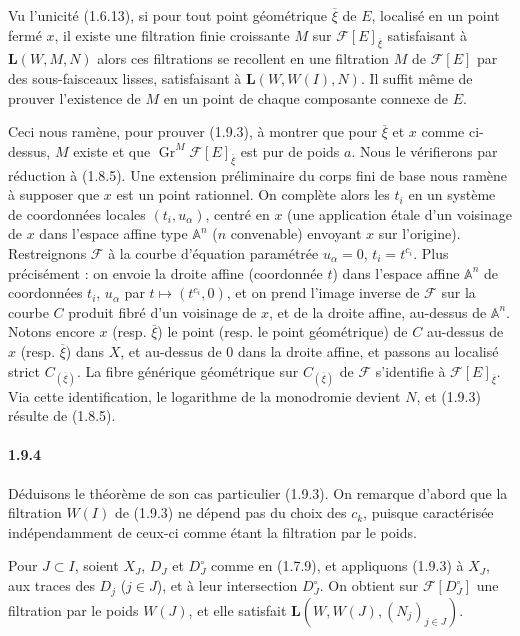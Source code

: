 \documentclass[12pt,a4paper]{article}
\theoremstyle{plain}
\theoremstyle{definition}
\theoremstyle{remark}
\DeclareMathOperator{\Gr}{Gr}
\renewcommand{\AA}{\ensuremath{\mathbb{A}}}
\begin{document}
Vu l'unicit\'e (1.6.13), si pour tout point g\'eom\'etrique $\overline{\xi}$ de $E$, localis\'e en un point ferm\'e $x$, il existe une filtration finie croissante $M$ sur $\mathscr{F}[E]_{\overline{\xi}}$ satisfaisant \`a $\mathbf{L}(W, M, N)$ alors ces filtrations se recollent en une filtration $M$ de $\mathscr{F}[E]$ par des sous-faisceaux lisses, satisfaisant \`a $\mathbf{L}(W, W(I), N)$. Il suffit m\^eme de prouver l'existence de $M$ en un point de chaque composante connexe de $E$.

Ceci nous ram\`ene, pour prouver (1.9.3), \`a montrer que pour $\overline{\xi}$ et $x$ comme ci-dessus, $M$ existe et que $\Gr^M \mathscr{F}[E]_{\overline{\xi}}$ est pur de poids $a$. Nous le v\'erifierons par r\'eduction \`a (1.8.5). Une extension pr\'eliminaire du corps fini de base nous ram\`ene \`a supposer que $x$ est un point rationnel. On compl\`ete alors les $t_i$ en un syst\`eme de coordonn\'ees locales $(t_i, u_\alpha)$, centr\'e en $x$ (une application \'etale d'un voisinage de $x$ dans l'espace affine type $\AA^n$ ($n$ convenable) envoyant $x$ sur l'origine). Restreignons $\mathscr{F}$ \`a la courbe d'\'equation param\'etr\'ee $u_\alpha = 0$, $t_i = t^{c_i}$. Plus pr\'ecis\'ement : on envoie la droite affine (coordonn\'ee $t$) dans l'espace affine $\AA^n$ de coordonn\'ees $t_i$, $u_\alpha$ par $t \mapsto (t^{c_i}, 0)$, et on prend l'image inverse de $\mathscr{F}$ sur la courbe $C$ produit fibr\'e d'un voisinage de $x$, et de la droite affine, au-dessus de $\AA^n$. Notons encore $x$ (resp. $\overline{\xi}$) le point (resp. le point g\'eom\'etrique) de $C$ au-dessus de $x$ (resp. $\overline{\xi}$) dans $X$, et au-dessus de $0$ dans la droite affine, et passons au localis\'e strict $C_{(\overline{\xi})}$. La fibre g\'en\'erique g\'eom\'etrique sur $C_{(\overline{\xi})}$ de $\mathscr{F}$ s'identifie \`a $\mathscr{F}[E]_{\overline{\xi}}$. Via cette identification, le logarithme de la monodromie devient $N$, et (1.9.3) r\'esulte de (1.8.5).

\paragraph{1.9.4}
D\'eduisons le th\'eor\`eme de son cas particulier (1.9.3). On remarque d'abord que la filtration $W(I)$ de (1.9.3) ne d\'epend pas du choix des $c_k$, puisque caract\'eris\'ee ind\'ependamment de ceux-ci comme \'etant la filtration par le poids.

Pour $J \subset I$, soient $X_J$, $D_J$ et $D_J^\circ$ comme en (1.7.9), et appliquons (1.9.3) \`a $X_J$, aux traces des $D_j$ ($j \in J$), et \`a leur intersection $D_J^\circ$. On obtient sur $\mathscr{F}[D_J^\circ]$ une filtration par le poids $W(J)$, et elle satisfait $\mathbf{L}(W, W(J), (N_j)_{j \in J})$.
\end{document}
